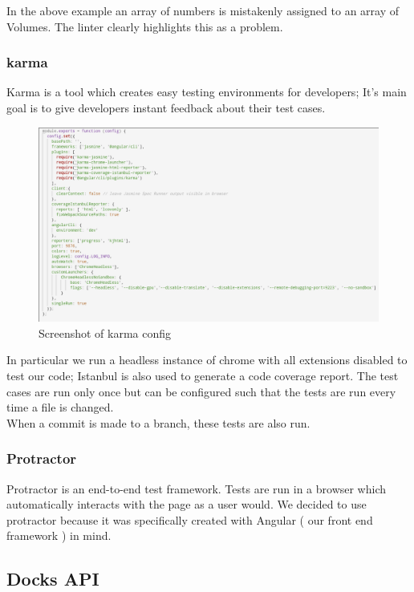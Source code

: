\documentclass[]{article}
\begin{document}
In the above example an array of numbers is mistakenly assigned to an array of Volumes. 
The linter clearly highlights this as a problem.

\pagebreak

\subsubsection{karma}
Karma is a tool which creates easy testing environments for developers; It's main goal 
is to give developers instant feedback about their test cases.
\begin{figure}[H]
	\centering
	\includegraphics[scale=0.4]{karma.png}
	\caption{Screenshot of karma config}
\end{figure}

In particular we run a headless instance of chrome with all extensions
disabled to test our code; Istanbul is also used to generate a code coverage
report. The test cases are run only once but can be configured such that the tests
are run every time a file is changed.
\\
When a commit is made to a branch, these tests are also run.

\subsubsection{Protractor}
Protractor is an end-to-end test framework. Tests are run in a browser which automatically interacts
with the page as a user would. We decided to use protractor because it was specifically
created with Angular ( our front end framework ) in mind.

\subsection{Docks API}
\end{document}
